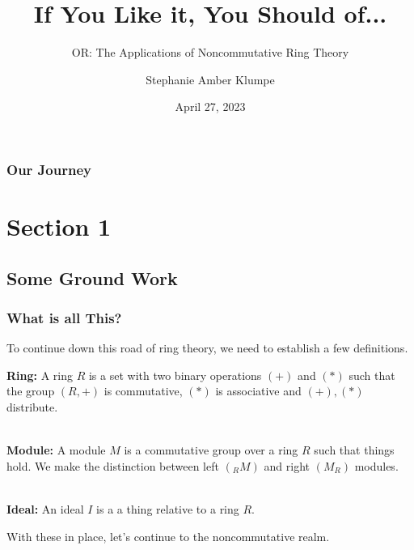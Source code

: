 \documentclass{beamer}
\title{If You Like it, You Should of...}
\subtitle{OR: The Applications of Noncommutative Ring Theory}
\author{Stephanie Amber Klumpe}
\institute{University of Colorado at Colorado Springs}
\date{April 27, 2023}
\begin{document}
\begin{frame}
    \titlepage
\end{frame}

\begin{frame}
    \frametitle{Our Journey}
    \tableofcontents
\end{frame}

\section{Section 1}
\subsection{Some Ground Work}

\begin{frame}
\frametitle{What is all This?}

To continue down this road of ring theory, we need to establish a few definitions.

\end{frame}

\begin{frame}

\textbf{Ring:} A ring $R$ is a set with two binary operations $(+)$ and $(*)$ such that the group
$(R,+)$ is commutative, $(*)$ is associative and $(+),(*)$ distribute.\\\

\textbf{Module:} A module $M$ is a commutative group over a ring $R$ such that things hold. We make the
distinction between left $(_RM)$ and right $(M_R)$ modules.\\\

\textbf{Ideal:} An ideal $I$ is a a thing relative to a ring $R$.

\end{frame}

\begin{frame}

With these in place, let's continue to the noncommutative realm.    

\end{frame}
\end{document}
